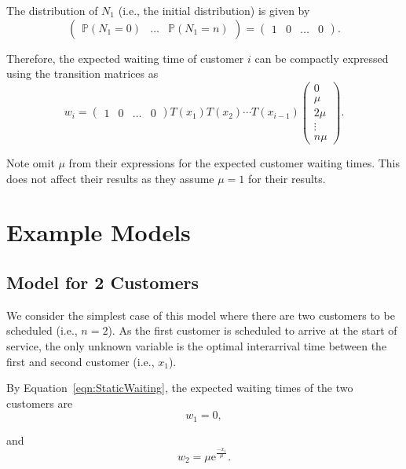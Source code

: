 The distribution of $N_{1}$ (i.e., the initial distribution) is given by
\begin{equation}
	\left( \begin{array}{ccc} \mathbb{P} (N_{1} = 0) & \ldots & \mathbb{P} (N_{1} = n) \end{array} \right) = \left( \begin{array}{cccc} 1 & 0 & \ldots & 0 \end{array} \right).
\end{equation}

Therefore, the expected waiting time of customer $i$ can be compactly expressed using the transition matrices as
\begin{equation}
	w_{i}
	= \left( \begin{array}{cccc} 1 & 0 & \ldots & 0 \end{array} \right)
	T (x_{1}) T (x_{2}) \cdots T (x_{i - 1})
	\left( \begin{array}{c} 0 \\ \mu \\ 2 \mu \\ \vdots \\ n \mu \end{array} \right).
	\label{eqn:StaticWaiting}
\end{equation}

Note \citet{Stein} omit $\mu$ from their expressions for the expected customer waiting times. This does not affect their results as they assume $\mu = 1$ for their results.

\section{Example Models}
\subsection{Model for 2 Customers}
\label{sec:StaticTwoCust}
We consider the simplest case of this model where there are two customers to be scheduled (i.e., $n = 2$). As the first customer is scheduled to arrive at the start of service, the only unknown variable is the optimal interarrival time between the first and second customer (i.e., $x_{1}$).

By Equation~\ref{eqn:StaticWaiting}, the expected waiting times of the two customers are
\begin{equation}
	w_{1} = 0,
\end{equation}

and
\begin{equation}
	w_{2} = \mu \mathrm{e}^{\frac{- x_{1}}{\mu}}.
\end{equation}

